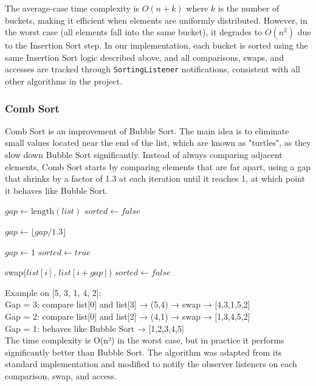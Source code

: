 \documentclass{article}
\begin{document}
The average-case time complexity is $O(n + k)$ where $k$ is the number of buckets, making it efficient when elements are uniformly distributed. However, in the worst case (all elements fall into the same bucket), it degrades to $O(n^2)$ due to the Insertion Sort step. In our implementation, each bucket is sorted using the same Insertion Sort logic described above, and all comparisons, swaps, and accesses are tracked through \texttt{SortingListener} notifications, consistent with all other algorithms in the project.

\subsubsection{Comb Sort}

Comb Sort is an improvement of Bubble Sort. The main idea is to eliminate small values located near the end of the list, which are known as "turtles", as they slow down Bubble Sort significantly. Instead of always comparing adjacent elements, Comb Sort starts by comparing elements that are far apart, using a gap that shrinks by a factor of 1.3 at each iteration until it reaches 1, at which point it behaves like Bubble Sort.

\begin{algorithm}[H]
\caption{Pseudocode for Comb Sort}
\begin{algorithmic}[1]
    \State $gap \gets \text{length}(list)$
    \State $sorted \gets false$
    
        \State $gap \gets \lfloor gap / 1.3 \rfloor$
        
            \State $gap \gets 1$
            \State $sorted \gets true$
        \EndIf
        
                \State swap($list[i]$, $list[i + gap]$)
                \State $sorted \gets false$
            \EndIf
        \EndFor
    \EndWhile
\end{algorithmic}
\end{algorithm}
Example on [5, 3, 1, 4, 2]:\\
Gap = 3: compare list[0] and list[3] → (5,4) → swap → [4,3,1,5,2] \\
Gap = 2: compare list[0] and list[2] → (4,1) → swap → [1,3,4,5,2] \\
Gap = 1: behaves like Bubble Sort → [1,2,3,4,5]\\
The time complexity is O(n²) in the worst case, but in practice it performs significantly better than Bubble Sort. The algorithm was adapted from its standard implementation and modified to notify the observer listeners on each comparison, swap, and access.
\end{document}
